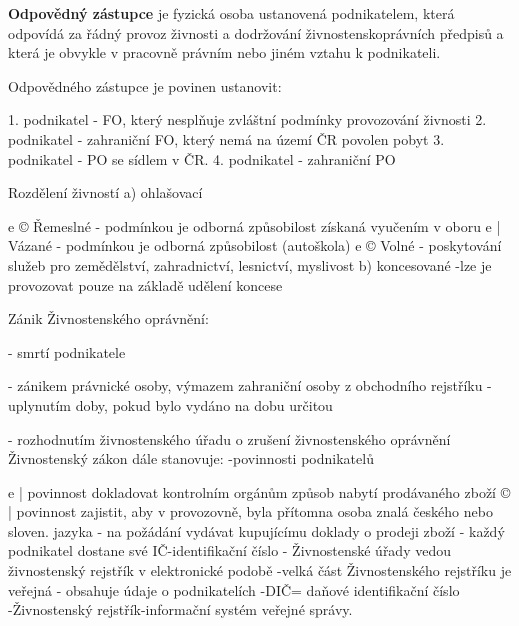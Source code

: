 \documentclass[11pt,a4paper,twoside]{book}
\begin{document}
\textbf{Odpovědný zástupce} je fyzická osoba ustanovená podnikatelem, která odpovídá za řádný provoz živnosti a dodržování živnostenskoprávních předpisů a která je obvykle v pracovně právním nebo jiném vztahu k podnikateli.

Odpovědného zástupce je povinen ustanovit:

1. podnikatel - FO, který nesplňuje zvláštní podmínky provozování živnosti
2. podnikatel - zahraniční FO, který nemá na území ČR povolen pobyt
3. podnikatel - PO se sídlem v ČR.
4. podnikatel - zahraniční PO

Rozdělení živností
a) ohlašovací



e © Řemeslné - podmínkou je odborná způsobilost získaná vyučením v oboru
e | Vázané - podmínkou je odborná způsobilost (autoškola)
e © Volné - poskytování služeb pro zemědělství, zahradnictví, lesnictví, myslivost
b) koncesované
-lze je provozovat pouze na základě udělení koncese

Zánik Živnostenského oprávnění:

- smrtí podnikatele

- zánikem právnické osoby, výmazem zahraniční osoby z obchodního rejstříku
- uplynutím doby, pokud bylo vydáno na dobu určitou

- rozhodnutím živnostenského úřadu o zrušení živnostenského oprávnění
\newpage
Živnostenský zákon dále stanovuje:
-povinnosti podnikatelů



e | povinnost dokladovat kontrolním orgánům způsob nabytí prodávaného zboží
© | povinnost zajistit, aby v provozovně, byla přítomna osoba znalá českého nebo sloven. jazyka
- na požádání vydávat kupujícímu doklady o prodeji zboží
- každý podnikatel dostane své IČ-identifikační číslo
- Živnostenské úřady vedou živnostenský rejstřík v elektronické podobě
-velká část Živnostenského rejstříku je veřejná - obsahuje údaje o podnikatelích
-DIČ= daňové identifikační číslo
-Živnostenský rejstřík-informační systém veřejné správy.
\end{document}
